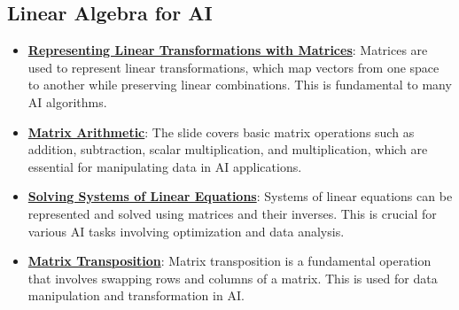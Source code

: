 \documentclass{article}%
\begin{document}
\subsection{Linear Algebra for AI}%
\label{subsec:LinearAlgebraforAI}%
\begin{itemize}[leftmargin=*]%
\item \href{\url{https://purdue.brightspace.com/d2l/common/assets/pdfjs-d2l-dist/1.0.14-legacy/web/viewer.html?file=\%252Fcontent\%252Fenforced\%252F1095467-wl.202510.CS.24300.001\%252F04L1-Linear\%20Algebra\%20Primer.pdf\%253Fou\%253D1095467\&lang=en-us\&container=d2l-fileviewer-rendered-pdf\&fullscreen=d2l-fileviewer-rendered-pdf-dialog\&height=667}#page=5}{\textbf{Representing Linear Transformations with Matrices}}: Matrices are used to represent linear transformations, which map vectors from one space to another while preserving linear combinations. This is fundamental to many AI algorithms.%
\item \href{\url{https://purdue.brightspace.com/d2l/common/assets/pdfjs-d2l-dist/1.0.14-legacy/web/viewer.html?file=\%252Fcontent\%252Fenforced\%252F1095467-wl.202510.CS.24300.001\%252F04L1-Linear\%20Algebra\%20Primer.pdf\%253Fou\%253D1095467\&lang=en-us\&container=d2l-fileviewer-rendered-pdf\&fullscreen=d2l-fileviewer-rendered-pdf-dialog\&height=667}#page=9}{\textbf{Matrix Arithmetic}}: The slide covers basic matrix operations such as addition, subtraction, scalar multiplication, and multiplication, which are essential for manipulating data in AI applications.%
\item \href{\url{https://purdue.brightspace.com/d2l/common/assets/pdfjs-d2l-dist/1.0.14-legacy/web/viewer.html?file=\%252Fcontent\%252Fenforced\%252F1095467-wl.202510.CS.24300.001\%252F04L1-Linear\%20Algebra\%20Primer.pdf\%253Fou\%253D1095467\&lang=en-us\&container=d2l-fileviewer-rendered-pdf\&fullscreen=d2l-fileviewer-rendered-pdf-dialog\&height=667}#page=11}{\textbf{Solving Systems of Linear Equations}}: Systems of linear equations can be represented and solved using matrices and their inverses. This is crucial for various AI tasks involving optimization and data analysis.%
\item \href{\url{https://purdue.brightspace.com/d2l/common/assets/pdfjs-d2l-dist/1.0.14-legacy/web/viewer.html?file=\%252Fcontent\%252Fenforced\%252F1095467-wl.202510.CS.24300.001\%252F04L1-Linear\%20Algebra\%20Primer.pdf\%253Fou\%253D1095467\&lang=en-us\&container=d2l-fileviewer-rendered-pdf\&fullscreen=d2l-fileviewer-rendered-pdf-dialog\&height=667}#page=16}{\textbf{Matrix Transposition}}: Matrix transposition is a fundamental operation that involves swapping rows and columns of a matrix. This is used for data manipulation and transformation in AI.%

\end{itemize}
\end{document}
